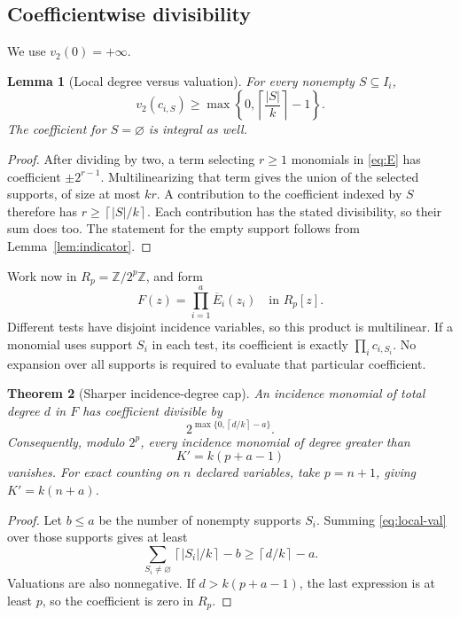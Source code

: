 \documentclass[11pt]{article}
\newtheorem{theorem}{Theorem}[section]
\newtheorem{lemma}[theorem]{Lemma}
\theoremstyle{definition}
\theoremstyle{remark}
\newcommand{\Z}{\mathbb Z}
\newcommand{\ceil}[1]{\left\lceil #1\right\rceil}
\begin{document}
\subsection{Coefficientwise divisibility}
We use $v_2(0)=+\infty$.

\begin{lemma}[Local degree versus valuation]\label{lem:valuation}
For every nonempty $S\subseteq I_i$,
\begin{equation}\label{eq:local-val}
 v_2(c_{i,S})\ge
 \max\left\{0,\ceil{\frac{|S|}{k}}-1\right\}.
\end{equation}
The coefficient for $S=\varnothing$ is integral as well.
\end{lemma}
\begin{proof}
After dividing by two, a term selecting $r\ge1$ monomials in
\eqref{eq:E} has coefficient $\pm2^{r-1}$. Multilinearizing that term
gives the union of the selected supports, of size at most $kr$. A contribution
to the coefficient indexed by $S$ therefore has
$r\ge\ceil{|S|/k}$. Each contribution has the stated divisibility, so their
sum does too. The statement for the empty support follows from
Lemma~\ref{lem:indicator}.
\end{proof}

Work now in $R_p=\Z/2^p\Z$, and form
\[
 F(z)=\prod_{i=1}^{a}\overline E_i(z_i)\quad\text{in }R_p[z].
\]
Different tests have disjoint incidence variables, so this product is
multilinear. If a monomial uses support $S_i$ in each test, its coefficient is
exactly $\prod_i c_{i,S_i}$. No expansion over all supports is required to
evaluate that particular coefficient.

\begin{theorem}[Sharper incidence-degree cap]\label{thm:cap}
An incidence monomial of total degree $d$ in $F$ has coefficient divisible by
\[
 2^{\max\{0,\ceil{d/k}-a\}}.
\]
Consequently, modulo $2^p$, every incidence monomial of degree greater than
\begin{equation}\label{eq:cap}
 K'=k(p+a-1)
\end{equation}
vanishes. For exact counting on $n$ declared variables, take $p=n+1$, giving
$K'=k(n+a)$.
\end{theorem}
\begin{proof}
Let $b\le a$ be the number of nonempty supports $S_i$. Summing
\eqref{eq:local-val} over those supports gives at least
\[
 \sum_{S_i\ne\varnothing}\ceil{|S_i|/k}-b
 \ge\ceil{d/k}-a.
\]
Valuations are also nonnegative. If $d>k(p+a-1)$, the last expression is
at least $p$, so the coefficient is zero in $R_p$.
\end{proof}
\end{document}
